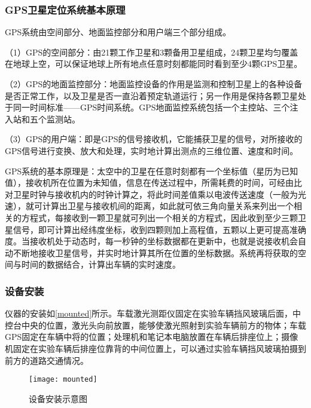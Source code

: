 \subsubsection{GPS卫星定位系统基本原理}
GPS系统由空间部分、地面监控部分和用户端三个部分组成。

（1）GPS的空间部分：由21颗工作卫星和3颗备用卫星组成，24颗卫星均匀覆盖在地球上空，可以保证地球上所有地点任意时刻都能同时看到至少4颗GPS卫星。

（2）GPS的地面监控部分：地面监控设备的作用是监测和控制卫星上的各种设备是否正常工作，以及卫星是否一直沿着预定轨道运行；另一作用是保持各颗卫星处于同一时间标准——GPS时间系统。GPS地面监控系统包括一个主控站、三个注入站和五个监测站。

（3）GPS的用户端：即是GPS的信号接收机，它能捕获卫星的信号，对所接收的GPS信号进行变换、放大和处理，实时地计算出测点的三维位置、速度和时间。

GPS系统的基本原理是：太空中的卫星在任意时刻都有一个坐标值（星历为已知值），接收机所在位置为未知值，信息在传送过程中，所需耗费的时间，可经由比对卫星时钟与接收机内的时钟计算之，将此时间差值乘以电波传送速度（一般为光速），就可计算出卫星与接收机间的距离，如此就可依三角向量关系来列出一个相关的方程式，每接收到一颗卫星就可列出一个相关的方程式，因此收到至少三颗卫星信号，即可计算出经纬度坐标，收到四颗则加上高程值，五颗以上更可提高准确度。当接收机处于动态时，每一秒钟的坐标数据都在更新中，也就是说接收机会自动不断地接收卫星信号，并实时地计算其所在位置的坐标数据。系统再将获取的空间与时间的数据结合，计算出车辆的实时速度。

\subsubsection{设备安装}
仪器的安装如\autoref{mounted}所示。车载激光测距仪固定在实验车辆挡风玻璃后面，中控台中央的位置，激光头向前放置，能够使激光照射到实验车辆前方的物体；车载GPS固定在车辆中将的位置；处理机和笔记本电脑放置在车辆后排座位上；摄像机固定在实验车辆后排座位靠背的中间位置上，可以通过实验车辆挡风玻璃拍摄到前方的道路交通情况。


\begin{figure}[htpb]
	\centering
	\texttt{[image: mounted]}
	\caption{设备安装示意图}
	\label{mounted}
\end{figure}




